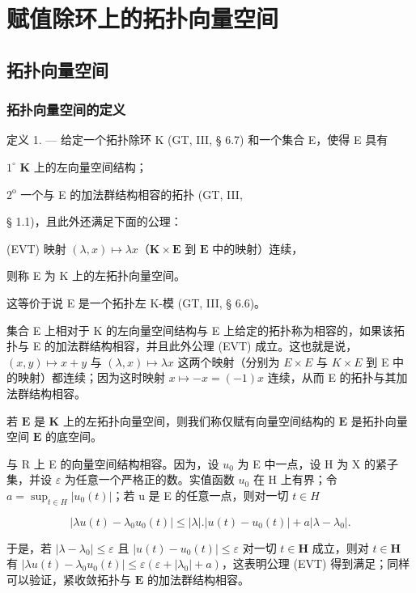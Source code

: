 \chapter{赋值除环上的拓扑向量空间}

\section{拓扑向量空间}

\subsection{拓扑向量空间的定义}

定义 1. --- 给定一个拓扑除环 K (GT, III, § 6.7) 和一个集合 E，使得 E 具有

\(1^{\circ}\) \(\mathbf{K}\) 上的左向量空间结构；

\(2^{\mathrm{o}}\) 一个与 E 的加法群结构相容的拓扑 (GT, III,

§ 1.1)，且此外还满足下面的公理：

(EVT) 映射 \((\lambda, x) \mapsto \lambda x\)（\(\mathbf{K} \times \mathbf{E}\) 到 \(\mathbf{E}\) 中的映射）连续，

则称 E 为 K 上的左拓扑向量空间。

这等价于说 E 是一个拓扑左 K-模 (GT, III, § 6.6)。

集合 E 上相对于 K 的左向量空间结构与 E 上给定的拓扑称为相容的，如果该拓扑与 E 的加法群结构相容，并且此外公理 (EVT) 成立。这也就是说，\((x, y) \mapsto x + y\) 与 \((\lambda, x) \mapsto \lambda x\) 这两个映射（分别为 \(E \times E\) 与 \(K \times E\) 到 E 中的映射）都连续；因为这时映射 \(x \mapsto -x = (-1)x\) 连续，从而 E 的拓扑与其加法群结构相容。

若 \(\mathbf{E}\) 是 \(\mathbf{K}\) 上的左拓扑向量空间，则我们称仅赋有向量空间结构的 \(\mathbf{E}\) 是拓扑向量空间 \(\mathbf{E}\) 的底空间。

与 R 上 E 的向量空间结构相容。因为，设 \(u_{0}\) 为 E 中一点，设 H 为 X 的紧子集，并设 \(\varepsilon\) 为任意一个严格正的数。实值函数 \(u_{0}\) 在 H 上有界；令 \(a = \sup_{t \in H} |u_{0}(t)|\)；若 u 是 E 的任意一点，则对一切 \(t \in H\)

\[
\left| \lambda u (t) - \lambda_ {0} u _ {0} (t) \right| \leqslant | \lambda |. \left| u (t) - u _ {0} (t) \right| + a \left| \lambda - \lambda_ {0} \right|.
\]

于是，若 \(|\lambda - \lambda_0| \leqslant \varepsilon\) 且 \(|u(t) - u_0(t)| \leqslant \varepsilon\) 对一切 \(t \in \mathbf{H}\) 成立，则对 \(t \in \mathbf{H}\) 有 \(|\lambda u(t) - \lambda_0 u_0(t)| \leqslant \varepsilon (\varepsilon + |\lambda_0| + a)\)，这表明公理 (EVT) 得到满足；同样可以验证，紧收敛拓扑与 \(\mathbf{E}\) 的加法群结构相容。

